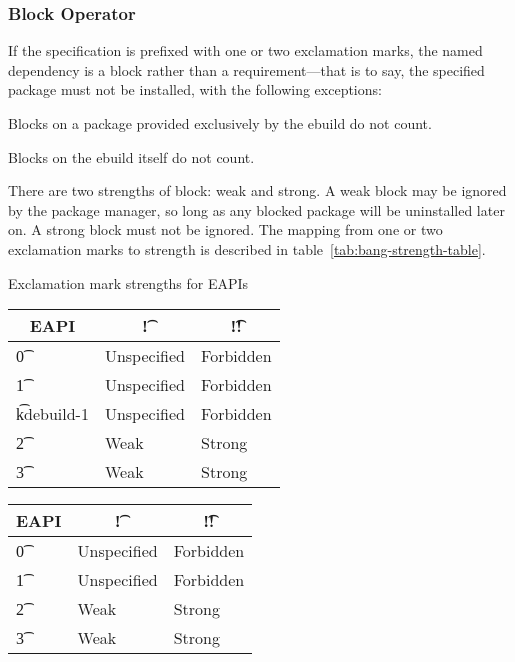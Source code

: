 \subsubsection{Block Operator}

If the specification is prefixed with one or two exclamation marks, the named dependency is a block
rather than a requirement---that is to say, the specified package must not be installed, with the
following exceptions:

\begin{compactitem}
\item Blocks on a package provided exclusively by the ebuild do not count. \label{provided-blocks}
\item Blocks on the ebuild itself do not count.
\end{compactitem}

 There are two strengths of block: weak and strong. A weak block may be
ignored by the package manager, so long as any blocked package will be uninstalled later on. A
strong block must not be ignored. The mapping from one or two exclamation marks to strength is
described in table~\ref{tab:bang-strength-table}.

\begin{centertable}{Exclamation mark strengths for EAPIs} \label{tab:bang-strength-table}
\IFKDEBUILDELSE
{
    \begin{tabular}{ l l l }
        \toprule
            \multicolumn{1}{c}{\textbf{EAPI}} &
            \multicolumn{1}{c}{\textbf{\t{!}}} &
            \multicolumn{1}{c}{\textbf{\t{!!}}} \\
            \midrule
    \t{0} & Unspecified & Forbidden \\
    \t{1} & Unspecified & Forbidden \\
    \t{kdebuild-1} & Unspecified & Forbidden \\
    \t{2} & Weak & Strong \\
    \t{3} & Weak & Strong \\
    \bottomrule
    \end{tabular}
}{
    \begin{tabular}{ l l l }
        \toprule
            \multicolumn{1}{c}{\textbf{EAPI}} &
            \multicolumn{1}{c}{\textbf{\t{!}}} &
            \multicolumn{1}{c}{\textbf{\t{!!}}} \\
            \midrule
    \t{0} & Unspecified & Forbidden \\
    \t{1} & Unspecified & Forbidden \\
    \t{2} & Weak & Strong \\
    \t{3} & Weak & Strong \\
    \bottomrule
    \end{tabular}
}
\end{centertable}

